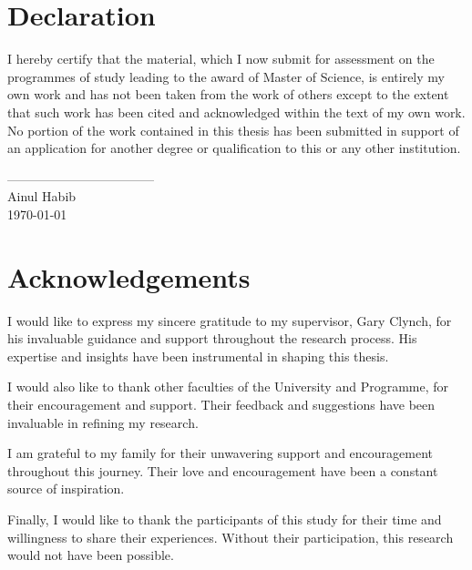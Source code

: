 \documentclass{article}
\begin{document}
\section*{Declaration}
\begin{flushleft}
I hereby certify that the material, which I now submit for assessment on the programmes of study leading to the award of Master of Science, is entirely my own work and has not been taken from the work of others except to the extent that such work has been cited and acknowledged within the text of my own work. No portion of the work contained in this thesis has been submitted in support of an application for another degree or qualification to this or any other institution.
\end{flushleft}
\vspace{2cm}
\begin{flushright}
-----------------------------------\\
Ainul Habib\\
\today
\end{flushright}
\pagebreak

\section*{Acknowledgements}
 
 I would like to express my sincere gratitude to my supervisor, Gary Clynch, for his invaluable guidance and support throughout the research process. His expertise and insights have been instrumental in shaping this thesis.

I would also like to thank other faculties of the University and Programme, for their encouragement and support. Their feedback and suggestions have been invaluable in refining my research.

I am grateful to my family for their unwavering support and encouragement throughout this journey. Their love and encouragement have been a constant source of inspiration.

Finally, I would like to thank the participants of this study for their time and willingness to share their experiences. Without their participation, this research would not have been possible.
\pagebreak

\listoffigures
\pagebreak
 

\pagebreak
\tableofcontents
\pagebreak
\end{document}

